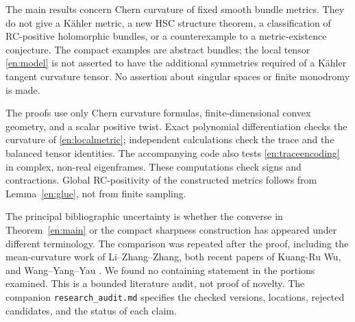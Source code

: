 \documentclass[12pt]{amsart}
\theoremstyle{definition}
\theoremstyle{remark}
\numberwithin{equation}{section}
\theoremstyle{definition}
\begin{document}
The main results concern Chern curvature of fixed smooth bundle metrics.
They do not give a K\"ahler metric, a new HSC structure theorem, a
classification of RC-positive holomorphic bundles, or a counterexample
to a metric-existence conjecture. The compact examples are abstract
bundles; the local tensor \eqref{en:model} is not asserted to have the
additional symmetries required of a K\"ahler tangent curvature tensor.
No assertion about singular spaces or finite monodromy is made.

The proofs use only Chern curvature formulas, finite-dimensional convex
geometry, and a scalar positive twist. Exact polynomial differentiation
checks the curvature of \eqref{en:localmetric}; independent calculations
check the trace and the balanced tensor identities. The accompanying
code also tests \eqref{en:traceencoding} in complex, non-real eigenframes.
These computations check signs and contractions. Global RC-positivity
of the constructed metrics follows from Lemma~\ref{en:glue}, not from
finite sampling.

The principal bibliographic uncertainty is whether the converse in
Theorem~\ref{en:main} or the compact sharpness construction has appeared
under different terminology. The comparison was repeated after the proof,
including the mean-curvature work of Li--Zhang--Zhang, both recent papers
of Kuang-Ru Wu, and Wang--Yang--Yau \cite{en:WYY}. We found no
containing statement in the portions examined. This is a bounded
literature audit, not proof of novelty. The companion
\texttt{research\_audit.md} specifies the checked versions, locations,
rejected candidates, and the status of each claim.
\end{document}

